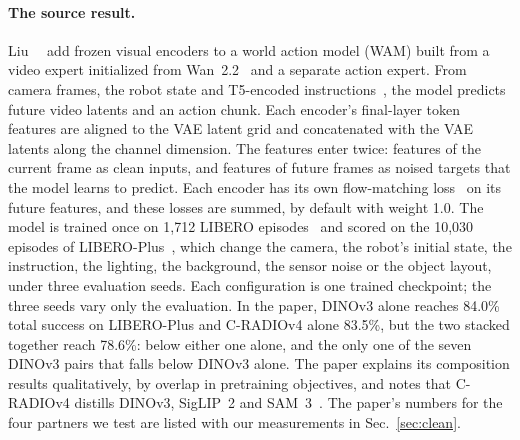 \paragraph{The source result.}
Liu~\etal~\cite{liu2026what} add frozen visual encoders to a world action model (WAM) built from a video expert initialized from Wan~2.2~ and a separate action expert.
From camera frames, the robot state and T5-encoded instructions~, the model predicts future video latents and an action chunk.
Each encoder's final-layer token features are aligned to the VAE latent grid and concatenated with the VAE latents along the channel dimension.
The features enter twice: features of the current frame as clean inputs, and features of future frames as noised targets that the model learns to predict.
Each encoder has its own flow-matching loss~ on its future features, and these losses are summed, by default with weight 1.0.
The model is trained once on 1,712 LIBERO episodes~\cite{liu2023libero} and scored on the 10,030 episodes of LIBERO-Plus~\cite{fei2025liberoplus}, which change the camera, the robot's initial state, the instruction, the lighting, the background, the sensor noise or the object layout, under three evaluation seeds.
Each configuration is one trained checkpoint; the three seeds vary only the evaluation.
In the paper, DINOv3 alone reaches 84.0\% total success on LIBERO-Plus and C-RADIOv4 alone 83.5\%, but the two stacked together reach 78.6\%: below either one alone, and the only one of the seven DINOv3 pairs that falls below DINOv3 alone.
The paper explains its composition results qualitatively, by overlap in pretraining objectives, and notes that C-RADIOv4 distills DINOv3, SigLIP~2 and SAM~3~\cite{liu2026what,ranzinger2026cradiov4}.
The paper's numbers for the four partners we test are listed with our measurements in Sec.~\ref{sec:clean}.

